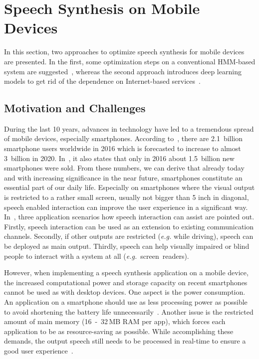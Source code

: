 \section{Speech Synthesis on Mobile Devices}
\label{sec:embeddedspeech}

In this section, two approaches to optimize speech synthesis for mobile devices are presented. In the first, some optimization steps on a conventional \ac{HMM}-based system are suggested~\cite{toth:optimizing}, whereas the second approach introduces deep learning models to get rid of the dependence on Internet-based services~\cite{boros:robust}.

\subsection{Motivation and Challenges}
\label{subsec:motembedded}

During the last 10 years, advances in technology have led to a tremendous spread of mobile devices, especially smartphones. According to~\cite{statista:smartphones}, there are 2.1~billion smartphone users worldwide in 2016 which is forecasted to increase to almost 3~billion in 2020. In~\cite{statista:smartphones}, it also states that only in 2016 about 1.5~billion new smartphones were sold. From these numbers, we can derive that already today and with increasing significance in the near future, smartphones constitute an essential part of our daily life. Especially on smartphones where the visual output is restricted to a rather small screen, usually not bigger than 5 inch in diagonal, speech enabled interaction can improve the user experience in a significant way. In~\cite{toth:optimizing}, three application scenarios how speech interaction can assist are pointed out. Firstly, speech interaction can be used as an extension to existing communication channels. Secondly, if other outputs are restricted (\textit{e.g.} while driving), speech can be deployed as main output. Thirdly, speech can help visually impaired or blind people to interact with a system at all (\textit{e.g.}~screen~readers).

However, when implementing a speech synthesis application on a mobile device, the increased computational power and storage capacity on recent smartphones cannot be used as with desktop devices. One aspect is the power consumption. An application on a smartphone should use as less processing power as possible to avoid shortening the battery life unnecessarily~\cite{toth:optimizing}. Another issue is the restricted amount of main memory (16~-~32\,MB RAM per app), which forces each application to be as resource-saving as possible. While accomplishing these demands, the output speech still needs to be processed in real-time to ensure a good user experience~\cite{boros:robust}.

